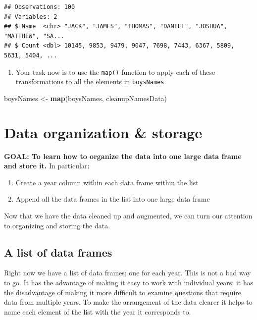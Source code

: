 \documentclass[]{book}
\newenvironment{Shaded}{\begin{snugshade}}{\end{snugshade}}
\newcommand{\KeywordTok}[1]{\textcolor[rgb]{0.13,0.29,0.53}{\textbf{#1}}}
\newcommand{\NormalTok}[1]{#1}
\newcommand{\StringTok}[1]{\textcolor[rgb]{0.31,0.60,0.02}{#1}}
\providecommand{\tightlist}{%
  \setlength{\itemsep}{0pt}\setlength{\parskip}{0pt}}
\begin{document}
\begin{verbatim}
## Observations: 100
## Variables: 2
## $ Name  <chr> "JACK", "JAMES", "THOMAS", "DANIEL", "JOSHUA", "MATTHEW", "SA...
## $ Count <dbl> 10145, 9853, 9479, 9047, 7698, 7443, 6367, 5809, 5631, 5404, ...
\end{verbatim}

\begin{enumerate}
\def\labelenumi{\arabic{enumi}.}
\setcounter{enumi}{1}
\tightlist
\item
  Your task now is to use the \texttt{map()} function to apply each of these transformations to all the elements in \texttt{boysNames}.
\end{enumerate}

\begin{Shaded}
\begin{Highlighting}[]
\NormalTok{boysNames <-}\StringTok{ }\KeywordTok{map}\NormalTok{(boysNames, cleanupNamesData)}
\end{Highlighting}
\end{Shaded}

\hypertarget{data-organization-storage}{%
\section{Data organization \& storage}\label{data-organization-storage}}

\textbf{GOAL: To learn how to organize the data into one large data frame and store it.} In particular:

\begin{enumerate}
\def\labelenumi{\arabic{enumi}.}
\tightlist
\item
  Create a year column within each data frame within the list
\item
  Append all the data frames in the list into one large data frame
\end{enumerate}

Now that we have the data cleaned up and augmented, we can turn our attention to organizing and storing the data.

\hypertarget{a-list-of-data-frames}{%
\subsection{A list of data frames}\label{a-list-of-data-frames}}

Right now we have a list of data frames; one for each year. This is not a bad way to go. It has the advantage of making it easy to work with individual years; it has the disadvantage of making it more difficult to examine questions that require data from multiple years. To make the arrangement of the data clearer it helps to name each element of the list with the year it corresponds to.
\end{document}
